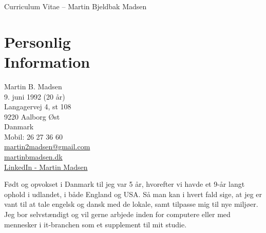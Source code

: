 \documentclass[margin,line,a4paper]{resume}
\begin{document}
\raggedright
{\sc \Large Curriculum Vitae -- Martin Bjeldbak Madsen}
\begin{resume}
    \vspace{0.5cm}
    \begin{figure}
         \vspace{-1cm}
        \begin{center}
        \end{center}
         \vspace{-2cm}
    \end{figure}

    \section{\mysidestyle Personlig\\Information}%
    Martin B. Madsen\\
    9. juni 1992 (20 år)\\ 
    Langagervej 4, st 108\\
    9220 Aalborg Øst\\
    Danmark\\
    Mobil: 26 27 36 60\\
    \href{mailto:martin2madsen@gmail.com}{martin2madsen@gmail.com}\\
    \href{http://www.martinbmadsen.dk}{martinbmadsen.dk}\\
    \href{http://dk.linkedin.com/pub/martin-madsen/21/9b0/b0}{LinkedIn - Martin Madsen}\vspace{1cm}

    Født og opvokset i Danmark til jeg var 5 år, hvorefter vi havde et
    9-år langt ophold i udlandet, i både England og USA. Så man kan i
    hvert fald sige, at jeg er vant til at tale engelsk og dansk med de lokale, samt tilpasse mig til nye miljøer. Jeg
    bor selvstændigt og vil gerne arbjede inden for computere eller
    med mennesker i it-branchen som et supplement til mit studie.


\end{resume}
\end{document}
